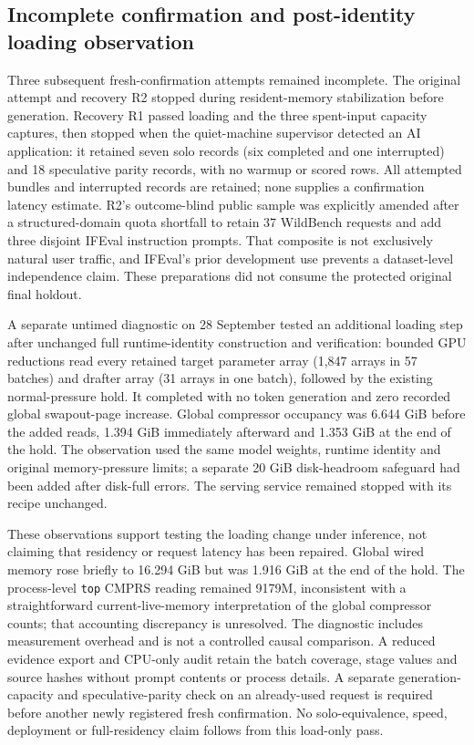 \documentclass[
  11pt,
]{article}
\newcounter{none} %
\begin{document}
\subsection{Incomplete confirmation and post-identity loading
observation}\label{incomplete-confirmation-and-post-identity-loading-observation}

Three subsequent fresh-confirmation attempts remained incomplete. The
original attempt and recovery R2 stopped during resident-memory
stabilization before generation. Recovery R1 passed loading and the
three spent-input capacity captures, then stopped when the quiet-machine
supervisor detected an AI application: it retained seven solo records
(six completed and one interrupted) and 18 speculative parity records,
with no warmup or scored rows. All attempted bundles and interrupted
records are retained; none supplies a confirmation latency estimate.
R2's outcome-blind public sample was explicitly amended after a
structured-domain quota shortfall to retain 37 WildBench requests and
add three disjoint IFEval instruction prompts. That composite is not
exclusively natural user traffic, and IFEval's prior development use
prevents a dataset-level independence claim. These preparations did not
consume the protected original final holdout.

A separate untimed diagnostic on 28 September tested an additional
loading step after unchanged full runtime-identity construction and
verification: bounded GPU reductions read every retained target
parameter array (1,847 arrays in 57 batches) and drafter array (31
arrays in one batch), followed by the existing normal-pressure hold. It
completed with no token generation and zero recorded global swapout-page
increase. Global compressor occupancy was 6.644 GiB before the added
reads, 1.394 GiB immediately afterward and 1.353 GiB at the end of the
hold. The observation used the same model weights, runtime identity and
original memory-pressure limits; a separate 20 GiB disk-headroom
safeguard had been added after disk-full errors. The serving service
remained stopped with its recipe unchanged.

These observations support testing the loading change under inference,
not claiming that residency or request latency has been repaired. Global
wired memory rose briefly to 16.294 GiB but was 1.916 GiB at the end of
the hold. The process-level \texttt{top} CMPRS reading remained 9179M,
inconsistent with a straightforward current-live-memory interpretation
of the global compressor counts; that accounting discrepancy is
unresolved. The diagnostic includes measurement overhead and is not a
controlled causal comparison. A reduced evidence export and CPU-only
audit retain the batch coverage, stage values and source hashes without
prompt contents or process details. A separate generation-capacity and
speculative-parity check on an already-used request is required before
another newly registered fresh confirmation. No solo-equivalence, speed,
deployment or full-residency claim follows from this load-only pass.
\end{document}
